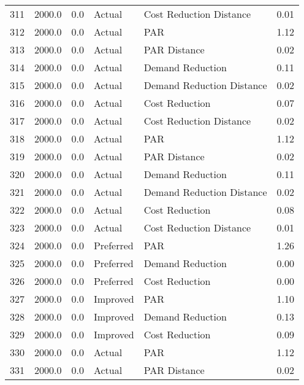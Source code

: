 \begin{longtable}{lrrllr}
311  &       2000.0 &     0.0 &         Actual &    Cost Reduction Distance &   0.01 \\
312  &       2000.0 &     0.0 &         Actual &                        PAR &   1.12 \\
313  &       2000.0 &     0.0 &         Actual &               PAR Distance &   0.02 \\
314  &       2000.0 &     0.0 &         Actual &           Demand Reduction &   0.11 \\
315  &       2000.0 &     0.0 &         Actual &  Demand Reduction Distance &   0.02 \\
316  &       2000.0 &     0.0 &         Actual &             Cost Reduction &   0.07 \\
317  &       2000.0 &     0.0 &         Actual &    Cost Reduction Distance &   0.02 \\
318  &       2000.0 &     0.0 &         Actual &                        PAR &   1.12 \\
319  &       2000.0 &     0.0 &         Actual &               PAR Distance &   0.02 \\
320  &       2000.0 &     0.0 &         Actual &           Demand Reduction &   0.11 \\
321  &       2000.0 &     0.0 &         Actual &  Demand Reduction Distance &   0.02 \\
322  &       2000.0 &     0.0 &         Actual &             Cost Reduction &   0.08 \\
323  &       2000.0 &     0.0 &         Actual &    Cost Reduction Distance &   0.01 \\
324  &       2000.0 &     0.0 &      Preferred &                        PAR &   1.26 \\
325  &       2000.0 &     0.0 &      Preferred &           Demand Reduction &   0.00 \\
326  &       2000.0 &     0.0 &      Preferred &             Cost Reduction &   0.00 \\
327  &       2000.0 &     0.0 &       Improved &                        PAR &   1.10 \\
328  &       2000.0 &     0.0 &       Improved &           Demand Reduction &   0.13 \\
329  &       2000.0 &     0.0 &       Improved &             Cost Reduction &   0.09 \\
330  &       2000.0 &     0.0 &         Actual &                        PAR &   1.12 \\
331  &       2000.0 &     0.0 &         Actual &               PAR Distance &   0.02 \\

\end{longtable}
